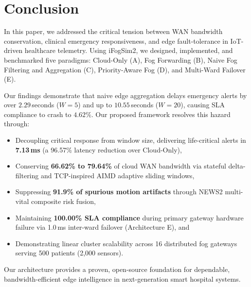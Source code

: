 \documentclass[conference]{IEEEtran}
\begin{document}
\section{Conclusion}
In this paper, we addressed the critical tension between WAN bandwidth conservation, clinical emergency responsiveness, and edge fault-tolerance in IoT-driven healthcare telemetry. Using iFogSim2, we designed, implemented, and benchmarked five paradigms: Cloud-Only (A), Fog Forwarding (B), Naive Fog Filtering and Aggregation (C), Priority-Aware Fog (D), and Multi-Ward Failover (E).

Our findings demonstrate that naive edge aggregation delays emergency alerts by over $2.29$\,seconds ($W=5$) and up to $10.55$\,seconds ($W=20$), causing SLA compliance to crash to $4.62\%$. Our proposed framework resolves this hazard through:
\begin{itemize}
    \item Decoupling critical response from window size, delivering life-critical alerts in \textbf{7.13\,ms} (a 96.57\% latency reduction over Cloud-Only),
    \item Conserving \textbf{66.62\% to 79.64\%} of cloud WAN bandwidth via stateful delta-filtering and TCP-inspired AIMD adaptive sliding windows,
    \item Suppressing \textbf{91.9\% of spurious motion artifacts} through NEWS2 multi-vital composite risk fusion,
    \item Maintaining \textbf{100.00\% SLA compliance} during primary gateway hardware failure via 1.0\,ms inter-ward failover (Architecture E), and
    \item Demonstrating linear cluster scalability across 16 distributed fog gateways serving 500 patients (2,000 sensors).
\end{itemize}
Our architecture provides a proven, open-source foundation for dependable, bandwidth-efficient edge intelligence in next-generation smart hospital systems.



\end{document}
